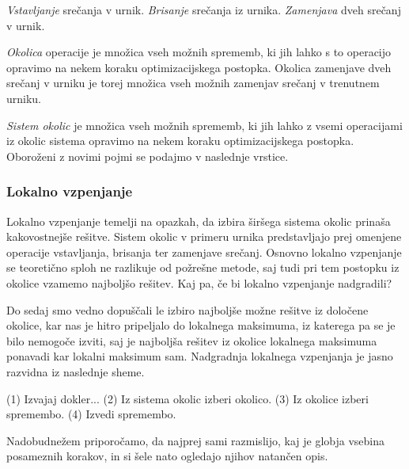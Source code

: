 \documentclass[a4paper,10pt]{article}
\begin{document}
   \emph{Vstavljanje} srečanja v urnik.
   \emph{Brisanje} srečanja iz urnika.
   \emph{Zamenjava} dveh srečanj v urnik.

\emph{Okolica} operacije je množica vseh možnih sprememb, ki jih lahko s to operacijo
opravimo na nekem koraku optimizacijskega postopka. Okolica zamenjave dveh srečanj v urniku
je torej množica vseh možnih zamenjav srečanj v trenutnem urniku.

\emph{Sistem okolic} je množica vseh možnih sprememb, ki jih lahko z vsemi operacijami iz
okolic sistema opravimo na nekem koraku optimizacijskega postopka. Oboroženi z novimi pojmi
se podajmo v naslednje vrstice.

\subsubsection{Lokalno vzpenjanje}

Lokalno vzpenjanje temelji na opazkah, da izbira širšega sistema okolic prinaša kakovostnejše
rešitve. Sistem okolic v primeru urnika predstavljajo prej omenjene operacije vstavljanja,
brisanja ter zamenjave srečanj. Osnovno lokalno vzpenjanje se teoretično sploh ne razlikuje
od požrešne metode, saj tudi pri tem postopku iz okolice vzamemo najboljšo rešitev. Kaj pa,
če bi lokalno vzpenjanje nadgradili?

Do sedaj smo vedno dopuščali le izbiro najboljše možne rešitve iz določene okolice, kar nas
je hitro pripeljalo do lokalnega maksimuma, iz katerega pa se je bilo nemogoče izviti, saj
je najboljša rešitev iz okolice lokalnega maksimuma ponavadi kar lokalni maksimum sam.
Nadgradnja lokalnega vzpenjanja je jasno razvidna iz naslednje sheme.

(1) Izvajaj dokler...
{
   (2) Iz sistema okolic izberi okolico.
   (3) Iz okolice izberi spremembo.
   (4) Izvedi spremembo.
}

Nadobudnežem priporočamo, da najprej sami razmislijo, kaj je globja vsebina posameznih
korakov, in si šele nato ogledajo njihov natančen opis.
\end{document}
